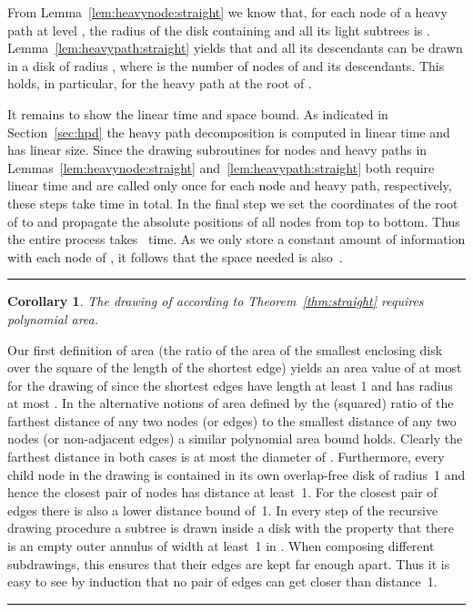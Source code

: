 \documentclass[11pt]{article}
\newtheorem{corollary}{Corollary}
\newcommand{\qed}{\hspace*{\fill}\rule{6pt}{6pt}}
\newenvironment{proof}{\noindent{\bf Proof:}}{\bigskip} \makeatletter
\begin{document}
\begin{proof}
  From Lemma~\ref{lem:heavynode:straight} we know that, for each node
   of a heavy path  at level , the radius of the disk 
  containing  and all its light subtrees is .
  Lemma~\ref{lem:heavypath:straight} yields that  and all its
  descendants can be drawn in a disk of radius , where  is the number of nodes of  and its
  descendants. This holds, in particular, for the heavy path 
  at the root of .

	It remains to show the linear time and space bound. 
	As indicated in Section~\ref{sec:hpd} the heavy path decomposition is computed in linear time and has linear size. 
	Since the drawing subroutines for nodes and heavy paths in Lemmas~\ref{lem:heavynode:straight} and~\ref{lem:heavypath:straight} both require linear time and are called only once for each node and heavy path, respectively, these steps take  time in total. 
	In the final step we set the coordinates of the root of  to  and propagate the absolute positions of all nodes from top to bottom. 
	Thus the entire process takes~ time. As we only store a constant amount of information with each node of , it follows that the space needed is also~.
	\qed
\end{proof}

\begin{corollary}\label{cor:area-straight}
	The drawing of  according to Theorem~\ref{thm:straight} requires polynomial area.
\end{corollary}

\begin{proof}
Our first definition of area (the ratio of the area of the smallest enclosing disk over the square of the length of the shortest edge) yields an area value of at most  for the drawing of  since the shortest edges have length at least 1 and  has radius at most .
In the alternative notions of area defined by the (squared) ratio of the farthest distance of any two nodes (or edges) to the smallest distance of any two nodes (or non-adjacent edges) a similar polynomial area bound holds.
Clearly the farthest distance in both cases is at most the diameter  of .
Furthermore, every child node in the drawing is contained in its own overlap-free disk of radius~1 and hence the closest pair of nodes has distance at least~1.
For the closest pair of edges there is also a lower distance bound of~1. 
In every step of the recursive drawing procedure a subtree  is drawn inside a disk  with the property that there is an empty outer annulus of width at least~1 in .
When composing different subdrawings, this ensures that their edges are kept far enough apart.
Thus it is easy to see by induction that no pair of edges can get closer than distance~1.
\qed
\end{proof}
\end{document}
